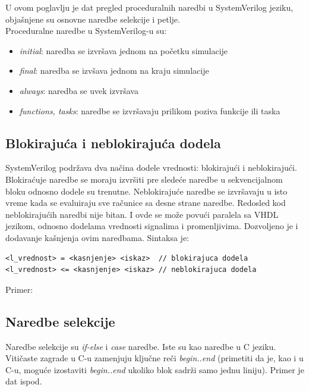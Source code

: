 U ovom poglavlju je dat pregled proceduralnih naredbi u SystemVerilog jeziku,
objašnjene su osnovne naredbe selekcije i petlje.\\

Proceduralne naredbe u SystemVerilog-u su:

\begin{itemize}
\item \emph{initial}: naredba se izvršava jednom na početku simulacije
\item \emph{final}: naredba se izvšava jednom na kraju simulacije
\item \emph{always}: naredba se uvek izvršava
\item \emph{functions, tasks}: naredbe se izvršavaju prilikom poziva funkcije ili taska
\end{itemize}


\subsection{Blokirajuća i neblokirajuća dodela}

SystemVerilog podržava dva načina dodele vrednosti: blokirajući i neblokirajući.
Blokiraćuje naredbe se moraju izvršiti pre sledeće naredbe u sekvencijalnom
bloku odnosno dodele su trenutne. Neblokirajuće naredbe se izvršavaju u isto
vreme kada se evaluiraju sve računice sa desne strane naredbe. Redosled kod
neblokirajućih naredbi nije bitan. I ovde se može povući paralela sa VHDL
jezikom, odnosno dodelama vrednosti signalima i promenljivima. Dozvoljeno je i
dodavanje kašnjenja ovim naredbama. Sintaksa je:

\begin{lstlisting}
<l_vrednost> = <kasnjenje> <iskaz>	// blokirajuca dodela
<l_vrednost> <= <kasnjenje> <iskaz>	// neblokirajuca dodela
\end{lstlisting}

Primer:



\subsection{Naredbe selekcije}

Naredbe selekcije su \emph{if-else} i \emph{case} naredbe. Iste su kao naredbe u
C jeziku.
Vitičaste zagrade u C-u zamenjuju ključne reči \emph{begin..end} (primetiti da
je, kao i u C-u, moguće izostaviti \emph{begin..end} ukoliko blok sadrži samo
jednu liniju).
Primer je dat ispod.

